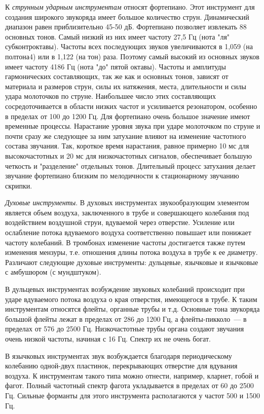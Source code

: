 \documentclass[oneside, final, 14pt]{extreport}
\begin{document}
К {\itshape струнным ударным инструментам} относят фортепиано. Этот инструмент для создания широкого звукоряда имеет большое количество струн. Динамический диапазон равен приблизительно 45-50 дБ. Фортепиано позволяет извлекать 88 основных тонов. Самый низкий из них имеет частоту 27,5 Гц (нота "ля" субконтроктавы). Частоты всех последующих звуков увеличиваются в 1,059 (на полтона4) или в 1,122 (на тон) раза. Поэтому самый высокий из основных звуков имеет частоту 4186 Гц (нота "до" пятой октавы). Частоты и амплитуды гармонических составляющих, так же как и основных тонов, зависят от материала и размеров струн, силы их натяжения, места, длительности и силы удара молоточков по струне. Наибольшее число этих составляющих сосредоточивается в области низких частот и усиливается резонатором, особенно в пределах от 100 до 1200 Гц. Для фортепиано очень большое значение имеют временные процессы. Нарастание уровня звука при ударе молоточком по струне и почти сразу же следующее за ним затухание влияют на изменение частотного состава звучания. Так, короткое время нарастания, равное примерно 10 мс для высокочастотных и 20 мс для низкочастотных сигналов, обеспечивает большую четкость и "разделение"
 отдельных тонов. Длительный процесс затухания делает звучание фортепиано близким по мелодичности
к стационарному звучанию скрипки.

{\itshape Духовые инструменты}. В духовых инструментах звукообразующим элементом является объем воздуха, заключенного в трубе и совершающего колебания под воздействием воздушной струи, вдуваемой через отверстие. Усиление или ослабление потока вдуваемого воздуха соответственно повышает или понижает частоту колебаний. В тромбонах изменение частоты достигается также путем изменения мензуры, т.е. отношения длины потока воздуха в трубе к ее диаметру. Различают следующие духовые инструменты: дульцевые, язычковые и язычковые с амбушюром (с мундштуком).

В дульцевых инструментах возбуждение звуковых колебаний происходит при ударе вдуваемого потока воздуха о края отверстия, имеющегося в трубе. К таким инструментам относятся флейты, органные трубы и т.д. Основные тона звукоряда большой флейты лежат в пределах от 286 до 1200 Гц, а флейты-пикколо~--- в пределах от 576 до 2500 Гц. Низкочастотные трубы органа создают звучания очень низкой частоты, начиная с 16 Гц. Спектр их не очень богат.

В язычковых инструментах звук возбуждается благодаря периодическому колебанию одной-двух пластинок, перекрывающих отверстие для вдувания воздуха. К инструментам такого типа можно отнести, например, кларнет, гобой и фагот. Полный частотный спектр фагота укладывается в пределах от 60 до 2500 Гц. Сильные форманты для этого инструмента располагаются у частот 500 и 1500 Гц.
\end{document}
